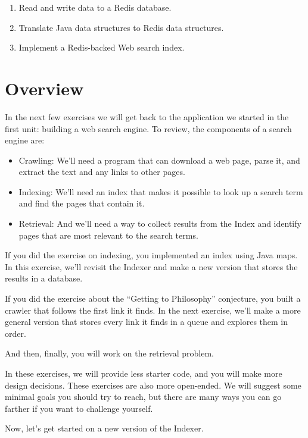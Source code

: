 \documentclass[12pt]{book}
\theoremstyle{exercise}
\begin{document}
\begin{enumerate}
\def\labelenumi{\arabic{enumi}.}
\itemsep1pt\parskip0pt
\item
  Read and write data to a Redis database.
\item
  Translate Java data structures to Redis data structures.
\item
  Implement a Redis-backed Web search index.
\end{enumerate}

\section{Overview}\label{overview-16}

In the next few exercises we will get back to the application we started in
the first unit: building a web search engine. To review, the components
of a search engine are:

\begin{itemize}
\item
  Crawling: We'll need a program that can download a web page, parse it,
  and extract the text and any links to other pages.
\item
  Indexing: We'll need an index that makes it possible to look up a
  search term and find the pages that contain it.
\item
  Retrieval: And we'll need a way to collect results from the Index and
  identify pages that are most relevant to the search terms.
\end{itemize}

If you did the exercise on indexing, you implemented an index using Java
maps. In this exercise, we'll revisit the Indexer and make a new version that
stores the results in a database.

If you did the exercise about the ``Getting to Philosophy'' conjecture, you
built a crawler that follows the first link it finds. In the next exercise,
we'll make a more general version that stores every link it finds in a
queue and explores them in order.

And then, finally, you will work on the retrieval problem.

In these exercises, we will provide less starter code, and you will make more
design decisions. These exercises are also more open-ended. We will suggest
some minimal goals you should try to reach, but there are many ways you
can go farther if you want to challenge yourself.

Now, let's get started on a new version of the Indexer.
\end{document}
